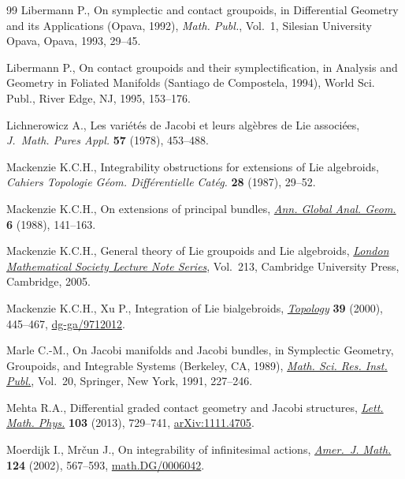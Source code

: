 \begin{thebibliography}{99}
Libermann P., On symplectic and contact groupoids, in Differential Geometry and
 its Applications ({O}pava, 1992), \textit{Math. Publ.}, Vol.~1, Silesian
 University Opava, Opava, 1993, 29--45.

Libermann P., On contact groupoids and their symplectif\/ication, in Analysis and
 Geometry in Foliated Manifolds ({S}antiago de {C}ompostela, 1994), World Sci.
 Publ., River Edge, NJ, 1995, 153--176.

Lichnerowicz A., Les vari\'et\'es de {J}acobi et leurs alg\`ebres de {L}ie
 associ\'ees, \textit{J.~Math. Pures Appl.} \textbf{57} (1978), 453--488.

Mackenzie K.C.H., Integrability obstructions for extensions of {L}ie algebroids,
 \textit{Cahiers Topologie G\'eom. Diff\'erentielle Cat\'eg.} \textbf{28}
 (1987), 29--52.

Mackenzie K.C.H., On extensions of principal bundles, \href{https://doi.org/10.1007/BF00133036}{\textit{Ann. Global Anal.
 Geom.}} \textbf{6} (1988), 141--163.

Mackenzie K.C.H., General theory of {L}ie groupoids and {L}ie algebroids,
 \href{https://doi.org/10.1017/CBO9781107325883}{\textit{London Mathematical Society Lecture Note Series}}, Vol.~213, Cambridge
 University Press, Cambridge, 2005.

Mackenzie K.C.H., Xu P., Integration of {L}ie bialgebroids, \href{https://doi.org/10.1016/S0040-9383(98)00069-X}{\textit{Topology}}
 \textbf{39} (2000), 445--467, \href{https://arxiv.org/abs/dg-ga/9712012}{dg-ga/9712012}.

Marle C.-M., On {J}acobi manifolds and {J}acobi bundles, in Symplectic Geometry,
 Groupoids, and Integrable Systems ({B}erkeley, {CA}, 1989), \href{https://doi.org/10.1007/978-1-4613-9719-9_16}{\textit{Math.
 Sci. Res. Inst. Publ.}}, Vol.~20, Springer, New York, 1991, 227--246.

Mehta R.A., Dif\/ferential graded contact geometry and {J}acobi structures,
 \href{https://doi.org/10.1007/s11005-013-0609-6}{\textit{Lett. Math. Phys.}} \textbf{103} (2013), 729--741, \href{https://arxiv.org/abs/1111.4705}{arXiv:1111.4705}.

Moerdijk I., Mr\v{c}un J., On integrability of inf\/initesimal actions,
 \href{https://doi.org/10.1353/ajm.2002.0019}{\textit{Amer.~J. Math.}} \textbf{124} (2002), 567--593,
 \href{https://arxiv.org/abs/math.DG/0006042}{math.DG/0006042}.


\end{thebibliography}
